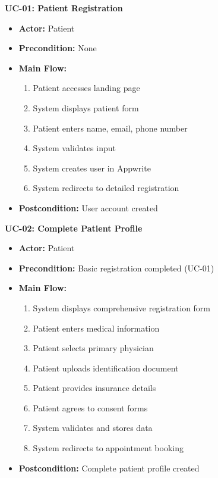 \documentclass[11pt,a4paper]{article}
\begin{document}
\textbf{UC-01: Patient Registration}
\begin{itemize}
    \item \textbf{Actor:} Patient
    \item \textbf{Precondition:} None
    \item \textbf{Main Flow:}
    \begin{enumerate}
        \item Patient accesses landing page
        \item System displays patient form
        \item Patient enters name, email, phone number
        \item System validates input
        \item System creates user in Appwrite
        \item System redirects to detailed registration
    \end{enumerate}
    \item \textbf{Postcondition:} User account created
\end{itemize}

\textbf{UC-02: Complete Patient Profile}
\begin{itemize}
    \item \textbf{Actor:} Patient
    \item \textbf{Precondition:} Basic registration completed (UC-01)
    \item \textbf{Main Flow:}
    \begin{enumerate}
        \item System displays comprehensive registration form
        \item Patient enters medical information
        \item Patient selects primary physician
        \item Patient uploads identification document
        \item Patient provides insurance details
        \item Patient agrees to consent forms
        \item System validates and stores data
        \item System redirects to appointment booking
    \end{enumerate}
    \item \textbf{Postcondition:} Complete patient profile created
\end{itemize}
\end{document}
